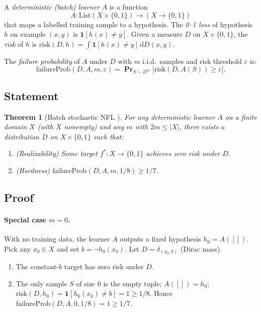 \documentclass[11pt]{article}
\newtheorem{theorem}{Theorem}[section]
\theoremstyle{remark}
\DeclareMathOperator{\Prob}{\mathbf{Pr}}
\newcommand{\Bool}{\{0,1\}}
\newcommand{\card}[1]{|#1|}
\begin{document}
A \emph{deterministic (batch) learner} $A$ is a function
\[
  A : \mathrm{List}(X \times \Bool) \to (X \to \Bool)
\]
that maps a labelled training sample to a hypothesis.  The
\emph{0--1 loss} of hypothesis $h$ on example $(x, y)$ is $\mathbf{1}[h(x)
\ne y]$.  Given a measure $D$ on $X \times \Bool$, the \emph{risk} of $h$
is $\mathrm{risk}(D, h) = \int \mathbf{1}[h(x) \ne y]\,\mathrm{d}D(x, y)$.

The \emph{failure probability} of $A$ under $D$ with $m$ i.i.d.\ samples
and risk threshold $\varepsilon$ is:
\[
  \mathrm{failureProb}(D, A, m, \varepsilon)
  = \Prob_{S \sim D^m}\!\bigl[\mathrm{risk}(D, A(S)) \ge \varepsilon\bigr].
\]

\subsection{Statement}

\begin{theorem}[Batch stochastic NFL \textup{\cite{ShalevShwartz2014}}]
\label{thm:batch}
  For any deterministic learner $A$ on a finite domain $X$ (with $X$
  nonempty) and any $m$ with $2m \le \card{X}$, there exists a
  distribution $D$ on $X \times \Bool$ such that:
  \begin{enumerate}
    \item \textup{(Realizability)} Some target $f^* : X \to \Bool$
          achieves zero risk under $D$.
    \item \textup{(Hardness)} $\mathrm{failureProb}(D, A, m, 1/8) \ge 1/7$.
  \end{enumerate}
\end{theorem}

\subsection{Proof}

\paragraph{Special case $m = 0$.}
With no training data, the learner $A$ outputs a fixed hypothesis
$h_0 = A([])$.  Pick any $x_0 \in X$ and set $b = \neg h_0(x_0)$.
Let $D = \delta_{(x_0, b)}$ (Dirac mass).
\begin{enumerate}
  \item The constant-$b$ target has zero risk under $D$.
  \item The only sample $S$ of size 0 is the empty tuple; $A([]) = h_0$;
        $\mathrm{risk}(D, h_0) = \mathbf{1}[h_0(x_0) \ne b] = 1 \ge 1/8$.
        Hence $\mathrm{failureProb}(D, A, 0, 1/8) = 1 \ge 1/7$.
\end{enumerate}
\end{document}
